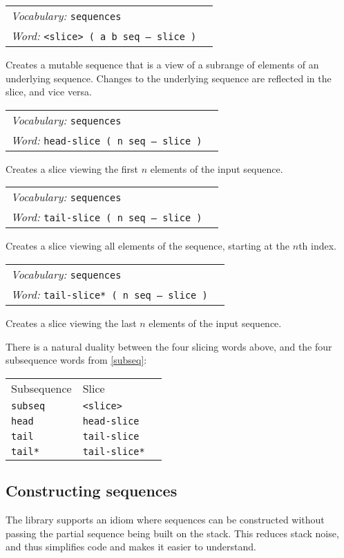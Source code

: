\documentclass{book}
\newcommand{\vocabulary}[1]{\emph{Vocabulary:} \texttt{#1}&\\}
\newcommand{\ordinaryword}[2]{\index{\texttt{#1}}\emph{Word:} \texttt{#2}&\\}
\newcommand{\wordtable}[1]{


\begin{tabularx}{12cm}{lX}
\hline
#1
\hline
\end{tabularx}

}
\begin{document}
\wordtable{
\vocabulary{sequences}
\ordinaryword{<slice>}{<slice> ( a b seq -- slice )}
}
Creates a mutable sequence that is a view of a subrange of elements of an underlying sequence. Changes to the underlying sequence are reflected in the slice, and vice versa.
\wordtable{
\vocabulary{sequences}
\ordinaryword{head-slice}{head-slice ( n seq -- slice )}
}
Creates a slice viewing the first $n$ elements of the input sequence.
\wordtable{
\vocabulary{sequences}
\ordinaryword{tail-slice}{tail-slice ( n seq -- slice )}
}
Creates a slice viewing all elements of the sequence, starting at the $n$th index.

\wordtable{
\vocabulary{sequences}
\ordinaryword{tail-slice*}{tail-slice* ( n seq -- slice )}
}
Creates a slice viewing the last $n$ elements of the input sequence.

There is a natural duality between the four slicing words above, and the four subsequence words from \ref{subseq}:

\begin{tabular}[t]{l|l|l}
Subsequence&Slice\\
\verb|subseq|&\verb|<slice>|\\
\verb|head|&\verb|head-slice|\\
\verb|tail|&\verb|tail-slice|\\
\verb|tail*|&\verb|tail-slice*|
\end{tabular}

\subsection{\label{make-seq}Constructing sequences}

The library supports an idiom where sequences can be constructed without passing the partial sequence being built on the stack. This reduces stack noise, and thus simplifies code and makes it easier to understand.
\end{document}
